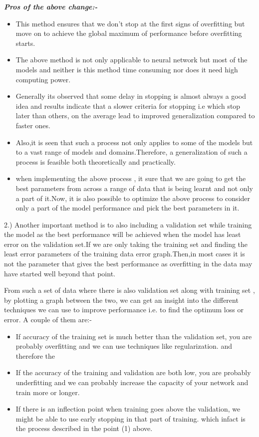 \documentclass{bmvc2k}
\begin{document}
\textbf{\textit{Pros of the above change:-}}

\begin{itemize}
\item This method ensures that we don't stop at the first signs of overfitting but move on  to achieve the global maximum of performance before overfitting starts.
\item The above method is not only applicable to neural network but most of the models and neither is this method time consuming nor does it need high computing power.
\item Generally its observed that some delay in stopping is almost always a good idea and results indicate that a slower criteria for stopping i.e which stop later than others, on the average lead to improved generalization compared to faster ones. 
\item Also,it is seen  that such a process not only applies to some of the models but to a vast range of models and domains.Therefore, a generalization of such a process is feasible both theoretically and practically.

\item when implementing the above process , it sure that we are going to get the best parameters from across a range of data that is being learnt and not only a part of it.Now, it is also possible to optimize the above process to consider only a part of the model performance and pick the best parameters in it. 
\end{itemize}
2.) Another important method is to also including a validation set while training the model as the best performance will be achieved when the model has least error on the validation set.If we are only taking the training set and finding the least error parameters of the training data error graph.Then,in most cases it is not the parameter that gives the best performance as overfitting in the data may have started well beyond that point.

From such a set of data where there is also validation set along with training set , by plotting a graph between the two, we can get an  insight into the different techniques we can use to improve performance i.e. to find the optimum loss or error.
A  couple of them are:-
\begin{itemize}
\item If accuracy of the training set is much better than the validation set, you are probably overfitting and we can use techniques like regularization. and therefore the 
\item If the accuracy of  the training and validation are both low, you are probably underfitting and we can probably increase the capacity of your network and train more or longer.
\item If there is an inflection point when training goes above the validation, we might be able to use early stopping in that part of training. which infact is the process described in the point (1) above.
\end{itemize}
\end{document}
